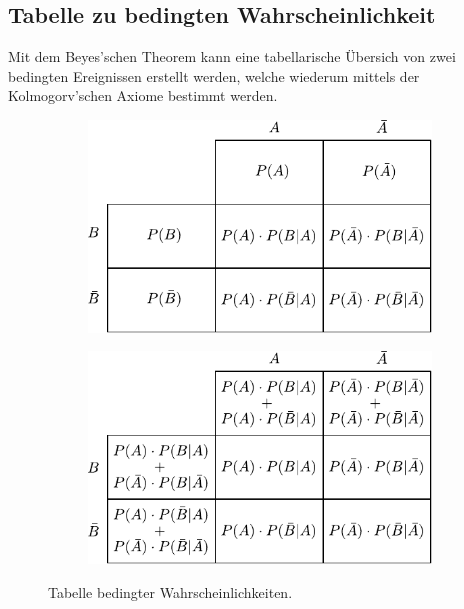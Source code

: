 \newpage
\subsection{Tabelle zu bedingten Wahrscheinlichkeit}
Mit dem Beyes'schen Theorem kann eine tabellarische Übersich von
zwei bedingten Ereignissen erstellt werden, welche wiederum mittels
der Kolmogorv'schen Axiome bestimmt werden.

\begin{figure}[h!]
	\centering
	\begin{subfigure}[b]{0.75\textwidth}
		\centering
		\includegraphics[width=1\textwidth]{bedingte-wahrscheinlichkeit.pdf}
	\end{subfigure}

	\rule[1mm]{0mm}{5mm}

	\begin{subfigure}[b]{0.75\textwidth}
		\centering
		\includegraphics[width=1\textwidth]{bedingte-wahrscheinlichkeit-detail.pdf}
	\end{subfigure}
	\caption{Tabelle bedingter Wahrscheinlichkeiten.}
\end{figure}

